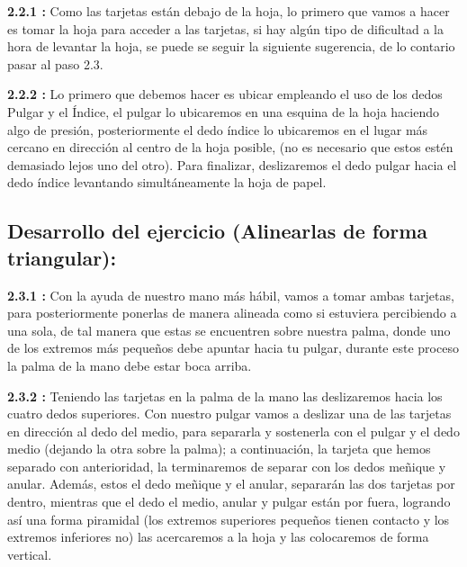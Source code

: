 \documentclass{article}
\begin{document}
\textbf{2.2.1 :} Como las tarjetas están debajo de la hoja, lo primero que vamos a hacer es tomar la     hoja    para acceder a las tarjetas, si hay algún tipo de dificultad a la hora de          levantar la            hoja, se puede se seguir la siguiente sugerencia, de lo contario pasar al paso 2.3.
\newline

\textbf{2.2.2 :} Lo primero que debemos hacer es ubicar empleando el uso de los dedos Pulgar y el Índice, el pulgar lo ubicaremos en una esquina de la hoja haciendo algo de presión, posteriormente el dedo índice lo ubicaremos en el lugar más cercano en dirección al centro de la hoja posible, (no es necesario que estos estén demasiado lejos uno del otro). Para finalizar, deslizaremos el dedo pulgar hacia el dedo índice levantando simultáneamente la hoja de papel.


\newline

\subsection{Desarrollo del ejercicio (Alinearlas de forma triangular): } 
\newline

\textbf{2.3.1 :}  Con la ayuda de nuestro mano más hábil, vamos a tomar ambas
tarjetas, para posteriormente ponerlas de manera alineada como si estuviera
percibiendo a una sola, de tal manera que estas se encuentren sobre nuestra
palma, donde uno de los extremos más pequeños debe apuntar hacia tu pulgar, durante este proceso la palma de la mano debe estar boca arriba.
\newline
   
\textbf{2.3.2 :} Teniendo las tarjetas en la palma de la mano las deslizaremos hacia los cuatro dedos superiores. Con nuestro pulgar vamos a deslizar una de las tarjetas en dirección al dedo del medio, para separarla y sostenerla con el pulgar y el dedo medio (dejando la otra sobre la palma); a continuación, la tarjeta que hemos separado con anterioridad, la terminaremos de separar con los dedos meñique y anular. Además, estos el dedo meñique y el anular, separarán las dos tarjetas por dentro, mientras que el dedo el medio, anular y pulgar están por fuera, logrando así una forma piramidal (los extremos superiores pequeños tienen contacto y los extremos inferiores no) las acercaremos a la hoja y las colocaremos de forma vertical.
\newline
   
\end{document}
